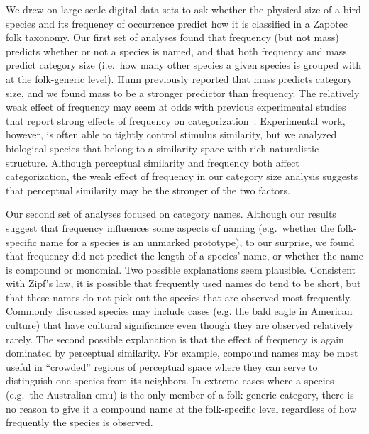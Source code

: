 \documentclass[10pt,letterpaper]{article}
\begin{document}
We drew on large-scale digital data sets to ask whether the physical size of a bird species and its frequency of occurrence predict how it is classified in a Zapotec folk taxonomy.  Our first set of analyses found that frequency (but not mass) predicts whether or not a species is named, and that both frequency and mass predict category size (i.e.\ how many other species a given species is grouped with at the folk-generic level). Hunn previously reported that mass predicts category size, and we found mass to be a stronger predictor than frequency. The relatively weak effect of frequency may seem at odds with previous experimental studies that report strong effects of frequency on categorization~\cite{parducci83}. Experimental work, however, is often able to tightly control stimulus similarity, but we analyzed biological species that belong to a similarity space with rich naturalistic structure. Although perceptual similarity and frequency both affect categorization, the weak effect of frequency in our category size analysis suggests that perceptual similarity may be the stronger of the two factors.  


Our second set of analyses focused on category names. Although our results suggest that frequency influences some aspects of naming (e.g.\ whether the folk-specific name for a species is an unmarked prototype), to our surprise, we found that frequency did not predict the length of a species' name, or whether the name is compound or monomial. Two possible explanations seem plausible. Consistent with Zipf's law, it is possible that frequently used names do tend to be short, but that these names do not pick out the species that are observed most frequently. Commonly discussed species may include cases (e.g. the bald eagle in American culture) that have cultural significance even though they are observed relatively rarely. The second possible explanation is that the effect of frequency is again dominated by perceptual similarity. For example, compound names may be most useful in ``crowded'' regions of perceptual space where they can serve to distinguish one species from its neighbors. In extreme cases where a species (e.g.\ the Australian emu) is the only member of a folk-generic category, there is no reason to give it a compound name at the folk-specific level regardless of how frequently the species is observed. 
\end{document}
